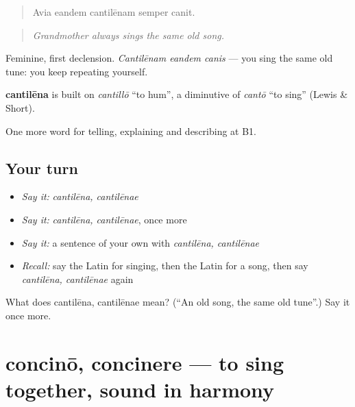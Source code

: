 \begin{quote}
Avia eandem cantilēnam semper canit.
\end{quote}

\begin{quote}
\emph{Grandmother always sings the same old song.}
\end{quote}

Feminine, first declension. \emph{Cantilēnam eandem canis} — you sing the same old tune: you keep repeating yourself.

\begin{cousinweb}
\textbf{cantilēna} is built on \emph{cantillō} \textquotedblleft{}to hum\textquotedblright{}, a diminutive of \emph{cantō} \textquotedblleft{}to sing\textquotedblright{} (Lewis \& Short).
\end{cousinweb}

\begin{grammarlens}[title={What you've built}]
One more word for telling, explaining and describing at B1.
\end{grammarlens}

\subsection*{Your turn}
\begin{itemize}
\raggedright
  \item \emph{Say it:} \emph{cantilēna, cantilēnae}
  \item \emph{Say it:} \emph{cantilēna, cantilēnae}, once more
  \item \emph{Say it:} a sentence of your own with \emph{cantilēna, cantilēnae}
  \item \emph{Recall:} say the Latin for singing, then the Latin for a song, then say \emph{cantilēna, cantilēnae} again
\end{itemize}

\begin{tcolorbox}[breakable,colback=teal!4,colframe=teal!35!black,title={Before you move on}]
What does cantilēna, cantilēnae mean? (\textquotedblleft{}An old song, the same old tune\textquotedblright{}.) Say it once more.
\end{tcolorbox}
\section[concinō, concinere]{concinō, concinere — to sing together, sound in harmony}

\label{lesson:LA-C543-concino}



